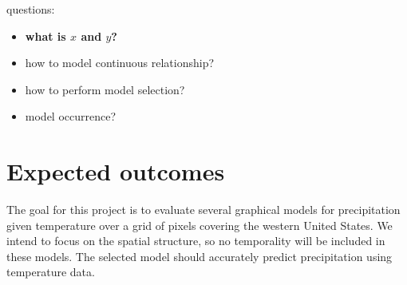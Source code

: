 \documentclass[twoside,11pt]{article}
\theoremstyle{definition}
\begin{document}
questions:
\begin{itemize}
\item {\bf what is $x$ and $y$?}
\item how to model continuous relationship?
\item how to perform model selection?
\item model occurrence?
\end{itemize}

\section*{Expected outcomes}
The goal for this project is to evaluate several graphical models for precipitation given temperature over a grid of pixels covering the western United States. We intend to focus on the spatial structure, so no temporality will be included in these models. The selected model should accurately predict precipitation using temperature data.
\end{document}
